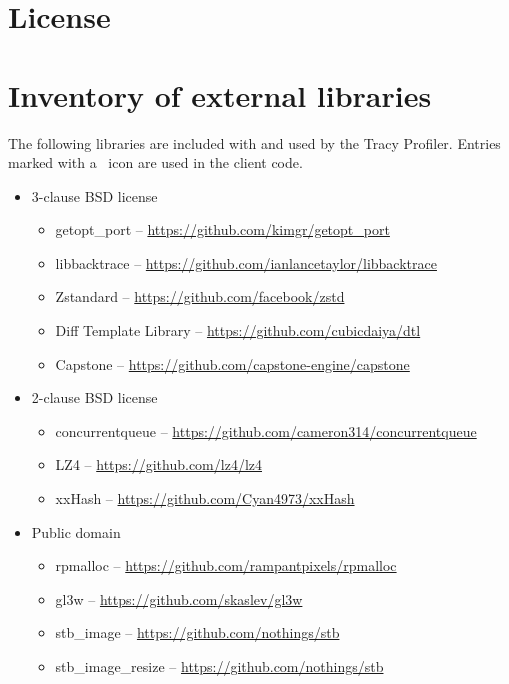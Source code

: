 \documentclass[hidelinks,titlepage,a4paper,twoside]{article}
\begin{document}
\newpage
\appendix
\appendixpage

\section{License}



\section{Inventory of external libraries}

The following libraries are included with and used by the Tracy Profiler. Entries marked with a \faStar{}~icon are used in the client code.

\begin{itemize}
\item 3-clause BSD license
\begin{itemize}
\item getopt\_port -- \url{https://github.com/kimgr/getopt\_port}
\item libbacktrace \faStar{} -- \url{https://github.com/ianlancetaylor/libbacktrace}
\item Zstandard -- \url{https://github.com/facebook/zstd}
\item Diff Template Library -- \url{https://github.com/cubicdaiya/dtl}
\item Capstone -- \url{https://github.com/capstone-engine/capstone}
\end{itemize}

\item 2-clause BSD license
\begin{itemize}
\item concurrentqueue \faStar{} -- \url{https://github.com/cameron314/concurrentqueue}
\item LZ4 \faStar{} -- \url{https://github.com/lz4/lz4}
\item xxHash -- \url{https://github.com/Cyan4973/xxHash}
\end{itemize}

\item Public domain
\begin{itemize}
\item rpmalloc \faStar{} -- \url{https://github.com/rampantpixels/rpmalloc}
\item gl3w -- \url{https://github.com/skaslev/gl3w}
\item stb\_image -- \url{https://github.com/nothings/stb}
\item stb\_image\_resize -- \url{https://github.com/nothings/stb}
\end{itemize}


\end{itemize}
\end{document}
